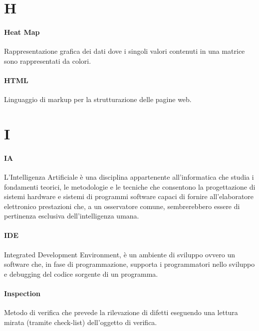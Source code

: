 \documentclass[]{article}
\begin{document}
	\newpage

	\section*{H}

	\paragraph*{Heat Map}
	Rappresentazione grafica dei dati dove i singoli valori contenuti in una matrice sono rappresentati da colori.

	\paragraph*{HTML}
	Linguaggio di markup per la strutturazione delle pagine web.

	\newpage

	\section*{I}

	\paragraph*{IA}
	L'Intelligenza Artificiale è una disciplina appartenente all'informatica che studia i fondamenti teorici, le metodologie e le tecniche che consentono la progettazione di sistemi hardware e sistemi di programmi software capaci di fornire all'elaboratore elettronico prestazioni che, a un osservatore comune, sembrerebbero essere di pertinenza esclusiva dell'intelligenza umana.

	\paragraph*{IDE}
	Integrated Development Environment, è un ambiente di sviluppo ovvero un software che, in fase di programmazione, supporta i programmatori nello sviluppo e debugging del codice sorgente di un programma.

	\paragraph*{Inspection}
	Metodo di verifica che prevede la rilevazione di difetti eseguendo una lettura mirata (tramite check-list) dell'oggetto di verifica.
	
\end{document}
